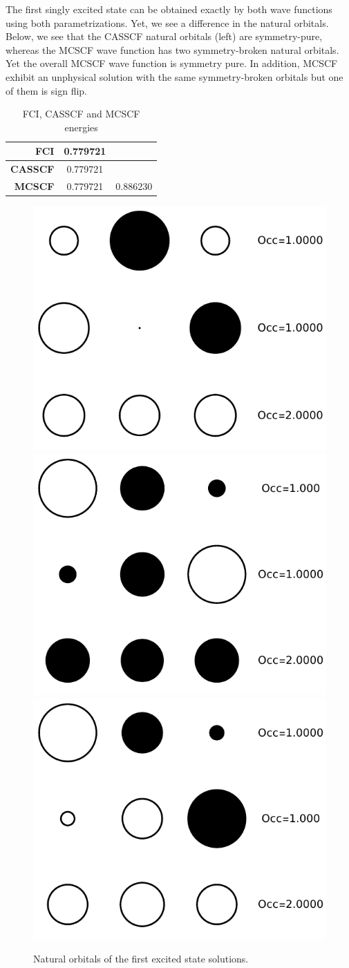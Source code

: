 \documentclass[11pt,a4paper]{article}
\begin{document}
The first singly excited state can be obtained exactly by both wave functions using both parametrizations. Yet, we see a difference in the natural orbitals. Below, we see that the CASSCF natural orbitals (left) are symmetry-pure, whereas the MCSCF wave function has two symmetry-broken natural orbitals. Yet the overall MCSCF wave function is symmetry pure. In addition, MCSCF exhibit an unphysical solution with the same symmetry-broken orbitals but one of them is sign flip.
\begin{table}
  \begin{center}
    \caption{FCI, CASSCF and MCSCF energies}
    \label{tab:table1}
    \begin{tabular}{r|c c}
      \textbf{FCI} & 0.779721 & \\
      \hline
      \textbf{CASSCF} & 0.779721 & \\
      \hline
      \textbf{MCSCF} & 0.779721 & 0.886230
    \end{tabular}
  \end{center}
\end{table}
\begin{figure}
  \centering
  \includegraphics[width=0.28\linewidth]{Figures/H3_ES1_CAS_NO}
  \hspace{0.65cm}
  \includegraphics[width=0.28\linewidth]{Figures/H3_ES1_MC1_NO}
  \hspace{0.65cm}
  \includegraphics[width=0.28\linewidth]{Figures/H3_ES1_MC2_NO}
  \caption{
    Natural orbitals of the first excited state solutions.
    \label{fig:H3_ES1_NO}}
\end{figure}
\end{document}
